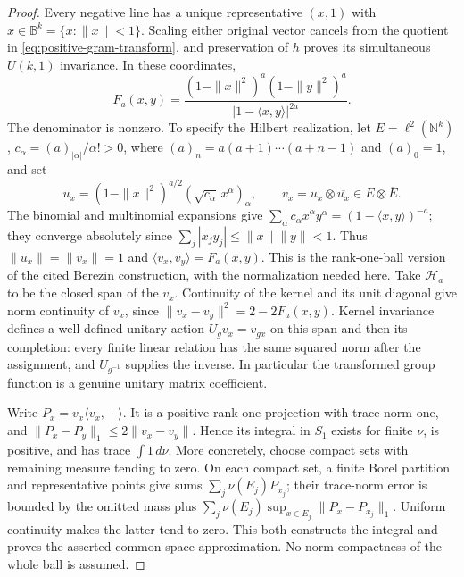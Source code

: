 \documentclass[11pt,a4paper]{article}
\begin{document}
\begin{proof}
Every negative line has a unique representative $(x,1)$ with
$x\in\mathbb B^k=\{x:\|x\|<1\}$.  Scaling either original vector cancels
from the quotient in \eqref{eq:positive-gram-transform}, and preservation of
$h$ proves its simultaneous $U(k,1)$ invariance.  In these coordinates,
\[
 F_a(x,y)=
 \frac{(1-\|x\|^2)^a(1-\|y\|^2)^a}
 {|1-\langle x,y\rangle|^{2a}}.
\]
The denominator is nonzero.  To specify the Hilbert realization, let
$E=\ell^2(\mathbb N^k)$, $c_\alpha=(a)_{|\alpha|}/\alpha!>0$, where
$(a)_n=a(a+1)\cdots(a+n-1)$ and $(a)_0=1$, and set
\[
 u_x=(1-\|x\|^2)^{a/2}
       (\sqrt{c_\alpha}\,x^\alpha)_\alpha,
 \qquad v_x=u_x\otimes\overline{u_x}\in E\otimes\overline E.
\]
The binomial and multinomial expansions give
$\sum_\alpha c_\alpha\overline{x}^\alpha y^\alpha
=(1-\langle x,y\rangle)^{-a}$; they converge absolutely since
$\sum_j|x_jy_j|\le\|x\|\|y\|<1$.  Thus $\|u_x\|=\|v_x\|=1$ and
$\langle v_x,v_y\rangle=F_a(x,y)$.  This is the rank-one-ball version of
the cited Berezin construction, with the normalization needed here.
Take $\mathcal H_a$ to be the closed span of the $v_x$.  Continuity of the
kernel and its unit diagonal give norm continuity of $v_x$, since
$\|v_x-v_y\|^2=2-2F_a(x,y)$.  Kernel invariance defines a well-defined
unitary action $U_gv_x=v_{gx}$ on this span and then its completion: every
finite linear relation has the same squared norm after the assignment, and
$U_{g^{-1}}$ supplies the inverse.  In particular the transformed group
function is a genuine unitary matrix coefficient.

Write $P_x=v_x\langle v_x,\,\cdot\,\rangle$.  It is a positive rank-one
projection with trace norm one, and
$\|P_x-P_y\|_1\le2\|v_x-v_y\|$.  Hence its integral in $S_1$ exists for
finite $\nu$, is positive, and has trace $\int1\,d\nu$.  More concretely,
choose compact sets with remaining measure tending to zero.  On each compact
set, a finite Borel partition and representative points give sums
$\sum_j\nu(E_j)P_{x_j}$; their trace-norm error is bounded by the omitted
mass plus $\sum_j\nu(E_j)\sup_{x\in E_j}\|P_x-P_{x_j}\|_1$.  Uniform
continuity makes the latter tend to zero.  This both constructs the integral
and proves the asserted common-space approximation.  No norm compactness of
the whole ball is assumed.


\end{proof}
\end{document}
